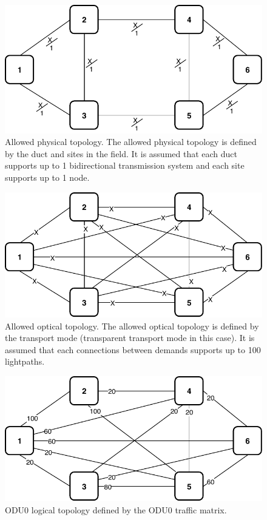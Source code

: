 \begin{figure}[h!]
\centering
\includegraphics[width=12cm]{sdf/ilp/transparent_survivability/figures/allowed_physical_topology}
\caption{Allowed physical topology. The allowed physical topology is defined by the duct and sites in the field. It is assumed that each duct supports up to 1 bidirectional transmission system and each site supports up to 1 node.}
\label{allowed2_physical_high}
\end{figure}

\vspace{11pt}
\begin{figure}[h!]
\centering
\includegraphics[width=12cm]{sdf/ilp/transparent_survivability/figures/allowed_optical_topology}
\caption{Allowed optical topology. The allowed optical topology is defined by the transport mode (transparent transport mode in this case). It is assumed that each connections between demands supports up to 100 lightpaths.}
\label{allowed2_optical_high}
\end{figure}

\newpage
\begin{figure}[h!]
\centering
\includegraphics[width=12cm]{sdf/ilp/transparent_survivability/figures/logical_topology_ODU0_high}
\caption{ODU0 logical topology defined by the ODU0 traffic matrix.}
\label{logical2_ODU0_high}
\end{figure}

